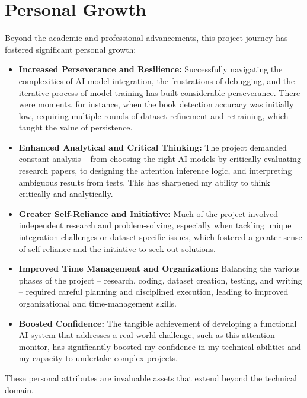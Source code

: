 \section{Personal Growth}
Beyond the academic and professional advancements, this project journey has fostered significant personal growth:
\begin{itemize}
    \item \textbf{Increased Perseverance and Resilience:} Successfully navigating the complexities of AI model integration, the frustrations of debugging, and the iterative process of model training has built considerable perseverance. There were moments, for instance, when the book detection accuracy was initially low, requiring multiple rounds of dataset refinement and retraining, which taught the value of persistence.
    \item \textbf{Enhanced Analytical and Critical Thinking:} The project demanded constant analysis – from choosing the right AI models by critically evaluating research papers, to designing the attention inference logic, and interpreting ambiguous results from tests. This has sharpened my ability to think critically and analytically.
    \item \textbf{Greater Self-Reliance and Initiative:} Much of the project involved independent research and problem-solving, especially when tackling unique integration challenges or dataset specific issues, which fostered a greater sense of self-reliance and the initiative to seek out solutions.
    \item \textbf{Improved Time Management and Organization:} Balancing the various phases of the project – research, coding, dataset creation, testing, and writing – required careful planning and disciplined execution, leading to improved organizational and time-management skills.
    \item \textbf{Boosted Confidence:} The tangible achievement of developing a functional AI system that addresses a real-world challenge, such as this attention monitor, has significantly boosted my confidence in my technical abilities and my capacity to undertake complex projects.
\end{itemize}
These personal attributes are invaluable assets that extend beyond the technical domain.

